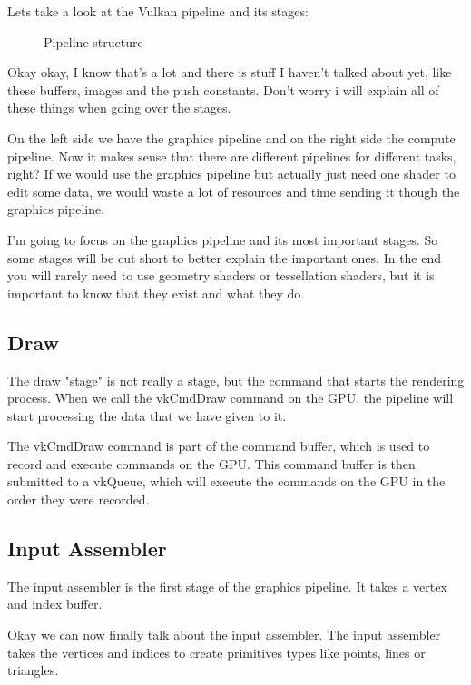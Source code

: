 \documentclass[12pt]{report} \usepackage{preamble}
\begin{document}
Lets take a look at the Vulkan pipeline and its stages:

\begin{figure}[hbtp]
	\fontsize{6}{10}\selectfont
	\centering 
	\caption{Pipeline structure \cite{fig:pipeline}}
\end{figure} \floatbarrier

Okay okay, I know that's a lot and there is stuff I haven't talked about
yet, like these buffers, images and the push constants. Don't worry i
will explain all of these things when going over the stages.

On the left side we have the graphics pipeline and on the right side the
compute pipeline. Now it makes sense that there are different pipelines
for different tasks, right? If we would use the graphics pipeline but
actually just need one shader to edit some data, we would waste a lot
of resources and time sending it though the graphics pipeline.

I'm going to focus on the graphics pipeline and its most important stages.
So some stages will be cut short to better explain the important ones.
In the end you will rarely need to use geometry shaders or tessellation
shaders, but it is important to know that they exist and what they do.

\subsection{Draw}

The draw "stage" is not really a stage, but the command that starts
the rendering process. When we call the vkCmdDraw command on the \ac{GPU},
the pipeline will start processing the data that we have given to
it. \cite{vulkan-spec-draw}

The vkCmdDraw command is part of the command buffer, which is used to
record and execute commands on the \ac{GPU}. This command buffer is then
submitted to a vkQueue, which will execute the commands on the \ac{GPU}
in the order they were recorded. \cite{command-buffers}

\subsection{Input Assembler}

The input assembler is the first stage of the graphics pipeline. It takes
a vertex and index buffer. \cite{vulkan-spec-pipelines}

Okay we can now finally talk about the input assembler. The input
assembler takes the vertices and indices to create primitives types like
points, lines or triangles. \cite{microsoft-ia}
\end{document}
